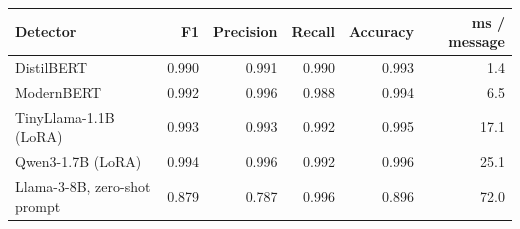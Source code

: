 \begin{tabular}{lrrrrr}
\toprule
Detector & F1 & Precision & Recall & Accuracy & ms / message \\
\midrule
DistilBERT & 0.990 & 0.991 & 0.990 & 0.993 & 1.4 \\
ModernBERT & 0.992 & 0.996 & 0.988 & 0.994 & 6.5 \\
TinyLlama-1.1B (LoRA) & 0.993 & 0.993 & 0.992 & 0.995 & 17.1 \\
Qwen3-1.7B (LoRA) & 0.994 & 0.996 & 0.992 & 0.996 & 25.1 \\
Llama-3-8B, zero-shot prompt & 0.879 & 0.787 & 0.996 & 0.896 & 72.0 \\
\bottomrule
\end{tabular}
